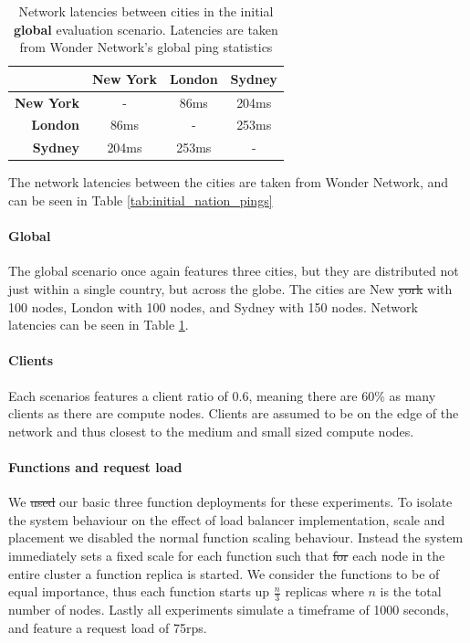\documentclass[draft,final]{vutinfth} %
\providecommand{\DIFaddtex}[1]{{\protect\color{blue}\uwave{#1}}} %
\providecommand{\DIFdeltex}[1]{{\protect\color{red}\sout{#1}}}                      %
\providecommand{\DIFaddbegin}{} %
\providecommand{\DIFaddend}{} %
\providecommand{\DIFdelbegin}{} %
\providecommand{\DIFdelend}{} %
\providecommand{\DIFadd}[1]{\texorpdfstring{\DIFaddtex{#1}}{#1}} %
\providecommand{\DIFdel}[1]{\texorpdfstring{\DIFdeltex{#1}}{}} %
\begin{document}
\begin{table}[]
\centering
\begin{tabular}{r|ccc}
\multicolumn{1}{c|}{} & \textbf{New York} & \textbf{London} & \textbf{Sydney} \\ \hline
\textbf{New York}     & -                 & 86ms            & 204ms           \\
\textbf{London}       & 86ms              & -               & 253ms           \\
\textbf{Sydney}       & 204ms             & 253ms           & -               \\ \hline
\end{tabular}

\caption{Network latencies between cities in the initial \textbf{global} evaluation scenario. Latencies are taken from Wonder Network's global ping statistics\cite{wondernetworkGlobalPingStatistics}}
\label{tab:initial_global_pings}
\end{table}   

The network latencies between the cities are taken from Wonder Network\cite{wondernetworkGlobalPingStatistics}, and can be seen in Table \ref{tab:initial_nation_pings}

\paragraph{Global}
The global scenario once again features three cities, but they are distributed not just within a single country, but across the globe.
The cities are New \DIFdelbegin \DIFdel{york }\DIFdelend \DIFaddbegin \DIFadd{York }\DIFaddend with 100 nodes, London with 100 nodes, and Sydney with 150 nodes.
Network latencies can be seen in Table \ref{tab:initial_global_pings}.

\paragraph{Clients}
Each scenarios features a client ratio of 0.6, meaning there are 60\% as many clients as there are compute nodes.
Clients are assumed to be on the edge of the network and thus closest to the medium and small sized compute nodes.

\paragraph{Functions and request load}
We \DIFdelbegin \DIFdel{used }\DIFdelend \DIFaddbegin \DIFadd{use }\DIFaddend our basic three function deployments for these experiments.
To isolate the system behaviour on the effect of load balancer implementation, scale and placement we disabled the normal function scaling behaviour.
Instead the system immediately sets a fixed scale for each function such that \DIFdelbegin \DIFdel{for }\DIFdelend \DIFaddbegin \DIFadd{on }\DIFaddend each node in the entire cluster a function replica is started.
We consider the functions to be of equal importance, thus each function starts up $\frac{n}{3}$ replicas where $n$ is the total number of nodes.
Lastly all experiments simulate a timeframe of 1000 seconds, and feature a request load of 75\gls{rps}.
\end{document}
